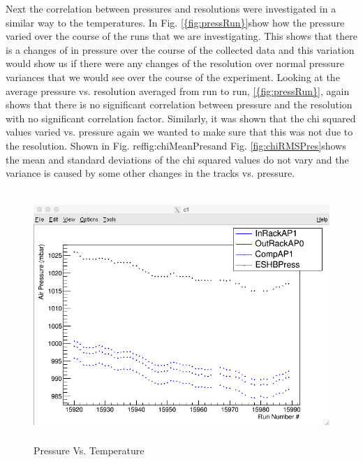 \documentclass[./Thesis]{subfiles}
\begin{document}
		 
	 Next the correlation between pressures and resolutions were investigated in a similar way to the temperatures. In Fig. \ref {{fig:pressRun}}show how the pressure varied over the course of the runs that we are investigating. This shows that there is a changes of in pressure over the course of the collected data and this variation would show us if there were any changes of the resolution over normal pressure variances that we would see over the course of the experiment. Looking at the average pressure vs. resolution averaged from run to run, \ref {{fig:pressRun}}, again shows that there is no significant correlation between pressure and the resolution with no significant correlation factor.  Similarly, it was shown that the chi squared values varied vs. pressure again we wanted to make sure that this was not due to the resolution. Shown in Fig. ref{fig:chiMeanPres}and Fig. \ref{fig:chiRMSPres}shows the mean and standard deviations of the chi squared values do not vary and the variance is caused by some other changes in the tracks vs. pressure.
 \begin{figure}
	\centerline{\includegraphics[height=95mm]{PressureVsRunNumber.png}}
	\caption[Pressure Vs Run Number]{Pressure Vs. Temperature}
	\label{fig:pressRun}
\end{figure} 	
\end{document}
